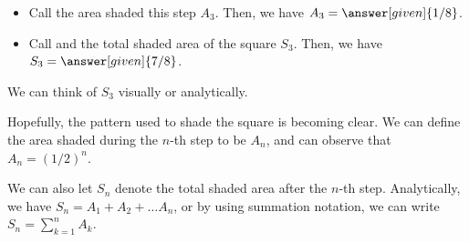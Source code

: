 \documentclass{ximera}
\begin{document}
\begin{example}
\begin{itemize}
\item Call the area shaded this step $A_3$.  Then, we have $A_3=\answer[given]{1/8}$.
\item Call and the total shaded area  of the square $S_3$.  Then, we have $S_3=\answer[given]{7/8}$.
\end{itemize}

We can think of $S_3$ visually or analytically. 



% 
% 
%   
%

\vspace{3mm}

Hopefully, the pattern used to shade the square is becoming clear.  We can define the area  shaded during the $n$-th step to be $A_n$, and can observe that $A_n=(1/2)^n$.

We can also let $S_n$ denote the total shaded area after the $n$-th step.  Analytically, we have $S_n = A_1+A_2 + \ldots A_n$, or by using summation notation, we can write $\displaystyle S_n = \sum_{k=1}^n A_k$.


\end{example}
\end{document}
